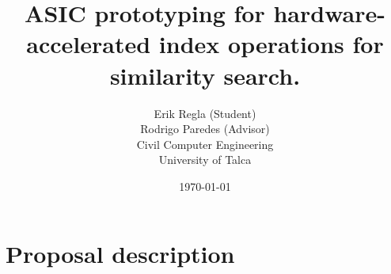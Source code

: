 \documentclass[11pt,letterpaper]{article}
\begin{document}
\pagestyle{empty}

\title{
    ASIC prototyping for hardware-accelerated index operations for similarity search.
}
\author{
Erik Regla (Student)\\%
Rodrigo Paredes (Advisor)\\%
Civil Computer Engineering\\ 
University of Talca}
\date{\today}
\maketitle


\section{Proposal description}
\end{document}
